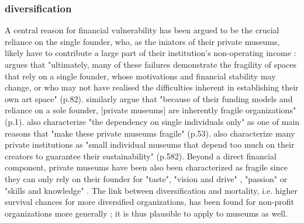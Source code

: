 \documentclass[12pt]{article}
\begin{document}
\subsubsection*{diversification}




A central reason for financial vulnerability has been argued to be the crucial reliance on the single founder, who, as the iniators of their private museums, likely have to contribute a large part of their institution's non-operating income \parencite{Frey_Meier_2002_beyeler}:
\textcite{Adam_2021_rise} argues that "ultimately, many of these failures demonstrate the fragility of spaces that rely on a single founder, whose motivations and financial stability may change, or who may not have realised the difficulties inherent in establishing their own art space" (p.82).
\textcite{Velthuis_Gera_2024_fragility} similarly argue that "because of their funding models and reliance on a sole founder, [private museums] are inherently fragile organizations" (p.1).
\textcite{Bechtler_Imhof_2018_future} also characterize "the dependency on single individuals only" as one of main reasons that "make these private museums fragile" (p.53).
\textcite{StylianouLambert_etal_2014_museums} also characterize many private institutions as "small individual museums that depend too much on their creators to guarantee their sustainability" (p.582).
Beyond a direct financial component, private museums have been also been characterized as fragile since they can only rely on their founder for "taste", "vision and drive" \parencite[p.77]{Adam_2021_rise}, "passion" \parencite[p.234]{Walker_2019_collector} or "skills and knowledge" \parencite[p.580]{StylianouLambert_etal_2014_museums}.
The link between diversification and mortality, i.e. higher survival chances for more diversified organizations, has been found for non-profit organizations more generally \parencite{Fernandez_2007_dissolution,Bielefeld_1994_survival,Hager_2001_vulnerability,Lu_Shon_Zhang_2019_dissolution}; it is thus plausible to apply to museums as well.
\end{document}

